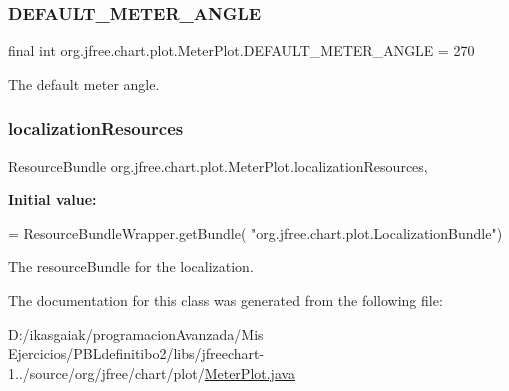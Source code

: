 \subsubsection{\texorpdfstring{D\+E\+F\+A\+U\+L\+T\+\_\+\+M\+E\+T\+E\+R\+\_\+\+A\+N\+G\+LE}{DEFAULT\_METER\_ANGLE}}
{\footnotesize\ttfamily final int org.\+jfree.\+chart.\+plot.\+Meter\+Plot.\+D\+E\+F\+A\+U\+L\+T\+\_\+\+M\+E\+T\+E\+R\+\_\+\+A\+N\+G\+LE = 270\hspace{0.3cm}{\ttfamily [static]}}

The default meter angle. \mbox{\label{classorg_1_1jfree_1_1chart_1_1plot_1_1_meter_plot_a60480a227e1bd8b165313c1a2f6f8c52}} 
\subsubsection{\texorpdfstring{localization\+Resources}{localizationResources}}
{\footnotesize\ttfamily Resource\+Bundle org.\+jfree.\+chart.\+plot.\+Meter\+Plot.\+localization\+Resources\hspace{0.3cm}{\ttfamily [static]}, {\ttfamily [protected]}}

{\bfseries Initial value\+:}
\begin{DoxyCode}
= ResourceBundleWrapper.getBundle(
                    \textcolor{stringliteral}{"org.jfree.chart.plot.LocalizationBundle"})
\end{DoxyCode}
The resource\+Bundle for the localization. 

The documentation for this class was generated from the following file\+:\begin{DoxyCompactItemize}
\item 
D\+:/ikasgaiak/programacion\+Avanzada/\+Mis Ejercicios/\+P\+B\+Ldefinitibo2/libs/jfreechart-\/1../source/org/jfree/chart/plot/\mbox{\hyperlink{_meter_plot_8java}{Meter\+Plot.\+java}}\end{DoxyCompactItemize}
